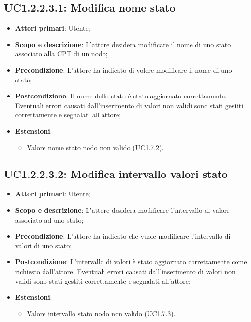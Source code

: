 \subsection{UC1.2.2.3.1: Modifica nome stato} 
\begin{itemize} 
	\item{\textbf{Attori primari}: Utente;} 
	\item{\textbf{Scopo e descrizione}: L'attore desidera modificare il nome di uno stato associato alla CPT di un nodo;} 
	\item{\textbf{Precondizione}: L'attore ha indicato di volere modificare il nome di uno stato;} 
	\item{\textbf{Postcondizione}: Il nome dello stato è stato aggiornato correttamente. Eventuali errori causati dall'inserimento di valori non validi sono stati gestiti correttamente e segnalati all'attore;}
	\item{\textbf{Estensioni}:
		\begin{itemize}
			\item{Valore nome stato nodo non valido (UC1.7.2)}.
		\end{itemize}
	}
\end{itemize} 
\subsection{UC1.2.2.3.2: Modifica intervallo valori stato} 
\begin{itemize} 
	\item{\textbf{Attori primari}: Utente;} 
	\item{\textbf{Scopo e descrizione}: L'attore desidera modificare l'intervallo di valori associato ad uno stato;} 
	\item{\textbf{Precondizione}: L'attore ha indicato che vuole modificare l'intervallo di valori di uno stato;} 
	\item{\textbf{Postcondizione}: L'intervallo di valori è stato aggiornato correttamente come richiesto dall'attore. Eventuali errori causati dall'inserimento di valori non validi sono stati gestiti correttamente e segnalati all'attore;}
	\item{\textbf{Estensioni}:
		\begin{itemize}
			\item{Valore intervallo stato nodo non valido (UC1.7.3).}
		\end{itemize}
	}
\end{itemize} 
